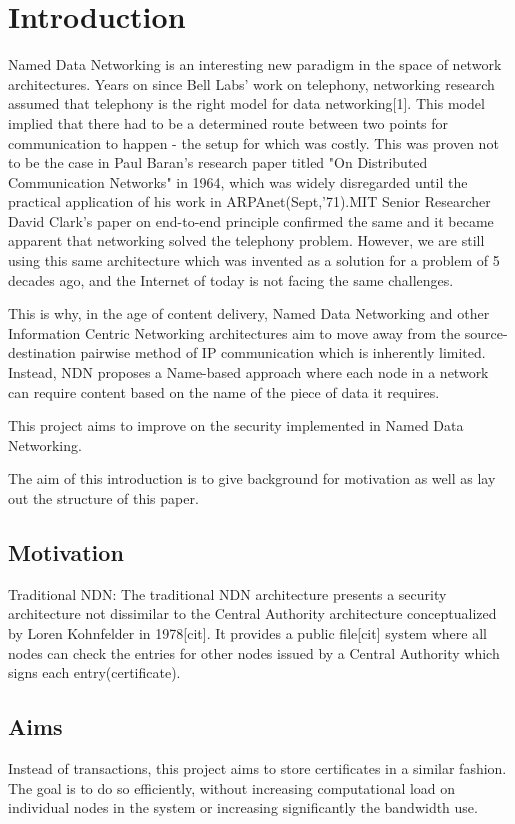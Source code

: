 \chapter{Introduction}
Named Data Networking is an interesting new paradigm in the space of network architectures. Years on since Bell Labs' work on telephony, networking research assumed that telephony is the right model for data networking[1]. This model implied that there had to be a determined route between two points for communication to happen - the setup for which was costly. This was proven not to be the case in Paul Baran's research paper titled "On Distributed Communication Networks" in 1964, which was widely disregarded until the practical application of his work in ARPAnet(Sept,'71).MIT Senior Researcher David Clark's paper on end-to-end principle confirmed the same and it became apparent that networking solved the telephony problem. However, we are still using this same architecture which was invented as a solution for a problem of 5 decades ago, and the Internet of today is not facing the same challenges. 

This is why, in the age of content delivery, Named Data Networking and other Information Centric Networking architectures aim to move away from the source-destination pairwise method of IP communication which is inherently limited. Instead, NDN proposes a Name-based approach where each node in a network can require content based on the name of the piece of data it requires. 

This project aims to improve on the security implemented in Named Data Networking.


The aim of this introduction is to give background for motivation as well as lay out the structure of this paper.
\section{Motivation}
Traditional NDN: The traditional NDN architecture presents a security architecture not dissimilar to the Central Authority architecture conceptualized by Loren Kohnfelder in 1978[cit]. It provides a public file[cit] system where all nodes can check the entries for other nodes issued by a Central Authority which signs each entry(certificate). 

\section{Aims}
Instead of transactions, this project aims to store certificates in a similar fashion. The goal is to do so efficiently, without increasing computational load on individual nodes in the system or increasing significantly the bandwidth use.

